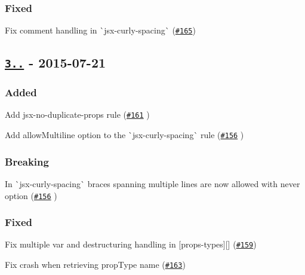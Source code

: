 \subsubsection*{Fixed}


\begin{DoxyItemize}
\item Fix comment handling in \`{}jsx-\/curly-\/spacing\`{} (\href{https://github.com/yannickcr/eslint-plugin-react/issues/165}{\tt \#165})
\end{DoxyItemize}

\subsection*{\href{https://github.com/yannickcr/eslint-plugin-react/compare/v2.7.1...v3.0.0}{\tt 3..} -\/ 2015-\/07-\/21}

\subsubsection*{Added}


\begin{DoxyItemize}
\item Add jsx-\/no-\/duplicate-\/props rule (\href{https://github.com/yannickcr/eslint-plugin-react/pull/161}{\tt \#161} )
\item Add allow\+Multiline option to the \`{}jsx-\/curly-\/spacing\`{} rule (\href{https://github.com/yannickcr/eslint-plugin-react/pull/156}{\tt \#156} )
\end{DoxyItemize}

\subsubsection*{Breaking}


\begin{DoxyItemize}
\item In \`{}jsx-\/curly-\/spacing\`{} braces spanning multiple lines are now allowed with {\ttfamily never} option (\href{https://github.com/yannickcr/eslint-plugin-react/pull/156}{\tt \#156} )
\end{DoxyItemize}

\subsubsection*{Fixed}


\begin{DoxyItemize}
\item Fix multiple var and destructuring handling in \mbox{[}{\ttfamily props-\/types}\mbox{]}\mbox{[}\mbox{]} (\href{https://github.com/yannickcr/eslint-plugin-react/issues/159}{\tt \#159})
\item Fix crash when retrieving prop\+Type name (\href{https://github.com/yannickcr/eslint-plugin-react/issues/163}{\tt \#163})
\end{DoxyItemize}

